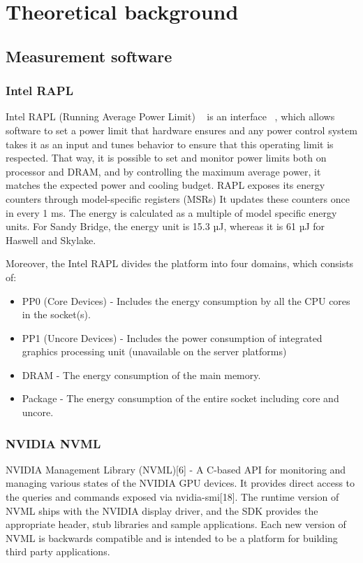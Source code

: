 \chapter{Theoretical background}

\section{Measurement software}

\subsection{Intel RAPL}

Intel RAPL (Running Average Power Limit)
~\cite{Power_Management_on_Intel_Microprocessor} is an interface
~\cite{RAPL_Power_Estimation_and_Capping}, which allows
software to set a power limit that hardware ensures and any
power control system takes it as an input and tunes behavior
to ensure that this operating limit is respected.
That way, it is possible to set and monitor power limits both
on processor and DRAM, and by controlling the maximum average
power, it matches the expected power and cooling budget. RAPL
exposes its energy counters through model-specific registers
(MSRs) It updates these counters once in every 1 ms. The energy
is calculated as a multiple of model specific energy units.
For Sandy Bridge, the energy unit is 15.3 µJ, whereas it is 61
µJ for Haswell and Skylake.

Moreover, the Intel RAPL divides the platform into four domains,
which consists of:

\begin{itemize}
    \item PP0 (Core Devices) - Includes the energy consumption
    by all the CPU cores in the socket(s).
    \item PP1 (Uncore Devices) - Includes the power consumption
    of integrated graphics processing unit (unavailable on the
    server platforms)
    \item DRAM - The energy consumption of the main memory.
    \item Package - The energy consumption of the entire socket
    including core and uncore.
\end{itemize}

\subsection{NVIDIA NVML}

NVIDIA Management Library (NVML)[6] - A C-based API for
monitoring and managing various states of the NVIDIA GPU
devices. It provides direct access to the queries and commands
exposed via nvidia-smi[18]. The runtime version of NVML ships
with the NVIDIA display driver, and the SDK provides the
appropriate header, stub libraries and sample applications.
Each new version of NVML is backwards compatible and is intended
to be a platform for building third party applications.

